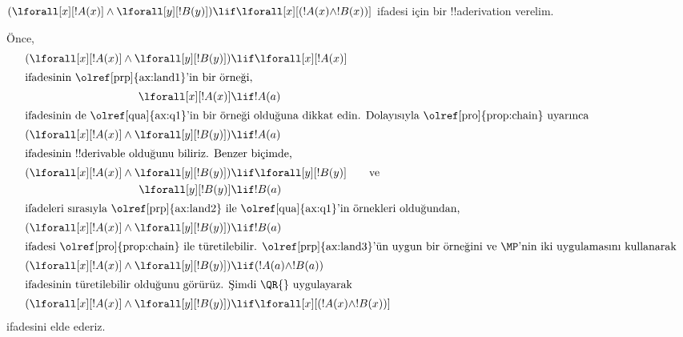 



\begin{ex}
$(\lforall[x][!A(x)] \land \lforall[y][!B(y)]) \lif
\lforall[x][(!A(x) \land !B(x))]$ ifadesi için bir !!a{derivation} verelim.

Önce,
\begin{align*}
  (\lforall[x][!A(x)] \land \lforall[y][!B(y)]) & \lif \lforall[x][!A(x)]
  \\
  \intertext{ifadesinin \olref[prp]{ax:land1}'in bir örneği,}
  \lforall[x][!A(x)] & \lif !A(a) \\
  \intertext{ifadesinin de \olref[qua]{ax:q1}'in bir örneği olduğuna dikkat edin. Dolayısıyla \olref[pro]{prop:chain} uyarınca}
  (\lforall[x][!A(x)] \land \lforall[y][!B(y)]) & \lif !A(a) \\
  \intertext{ifadesinin !!{derivable} olduğunu biliriz. Benzer biçimde,}
  (\lforall[x][!A(x)] \land \lforall[y][!B(y)]) & \lif \lforall[y][!B(y)] \qquad\text{ve}\\
    \lforall[y][!B(y)] & \lif !B(a)\\
    \intertext{ifadeleri sırasıyla \olref[prp]{ax:land2} ile \olref[qua]{ax:q1}'in örnekleri olduğundan,}
    (\lforall[x][!A(x)] \land \lforall[y][!B(y)]) & \lif !B(a)\\
    \intertext{ifadesi \olref[pro]{prop:chain} ile türetilebilir. \olref[prp]{ax:land3}'ün uygun bir örneğini ve \MP'nin iki uygulamasını kullanarak}
    (\lforall[x][!A(x)] \land \lforall[y][!B(y)]) & \lif (!A(a) \land !B(a))\\
    \intertext{ifadesinin türetilebilir olduğunu görürüz. Şimdi \QR{} uygulayarak}
(\lforall[x][!A(x)] \land \lforall[y][!B(y)]) & \lif \lforall[x][(!A(x) \land !B(x))]
\end{align*}
ifadesini elde ederiz.
\end{ex}

